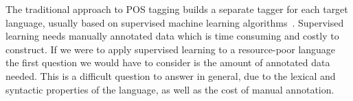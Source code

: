 \documentclass[12pt,twoside,final,hidelinks]{ltthesis}
\theoremstyle{definition}
\begin{document}
The traditional approach to POS tagging builds a separate tagger for each target language, usually based on supervised machine learning algorithms~\cite{TNTTagger,Brill95transformation,Toutanova:2003}. %
Supervised learning needs manually annotated data which is time consuming and costly to construct. If we were to apply supervised learning to a resource-poor language 
the first question we would have to consider is the amount of annotated data needed. This is a difficult question to answer in general, due to the lexical and syntactic properties of the language, %
 as well as the cost of manual annotation. 
\end{document}
